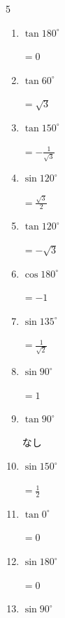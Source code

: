\begin{multicols}{5}
\begin{enumerate}
        $\displaystyle =\frac{1}{\sqrt{2}}$

  \item $\displaystyle \tan{180^\circ}$

        $\displaystyle =0$

\columnbreak %

\resetques

  \item $\displaystyle \tan{60^\circ}$

        $\displaystyle =\sqrt{3}$

  \item $\displaystyle \tan{150^\circ}$

        $\displaystyle =-\frac{1}{\sqrt{3}}$

  \item $\displaystyle \sin{120^\circ}$

        $\displaystyle =\frac{\sqrt{3}}{2}$

  \item $\displaystyle \tan{120^\circ}$

        $\displaystyle =-\sqrt{3}$

  \item $\displaystyle \cos{180^\circ}$

        $\displaystyle =-1$

  \item $\displaystyle \sin{135^\circ}$

        $\displaystyle =\frac{1}{\sqrt{2}}$

  \item $\displaystyle \sin{90^\circ}$

        $\displaystyle =1$

  \item $\displaystyle \tan{90^\circ}$

        $\displaystyle なし$

  \item $\displaystyle \sin{150^\circ}$

        $\displaystyle =\frac{1}{2}$

  \item $\displaystyle \tan{0^\circ}$

        $\displaystyle =0$

  \item $\displaystyle \sin{180^\circ}$

        $\displaystyle =0$

  \item $\displaystyle \sin{90^\circ}$


\end{enumerate}
\end{multicols}
